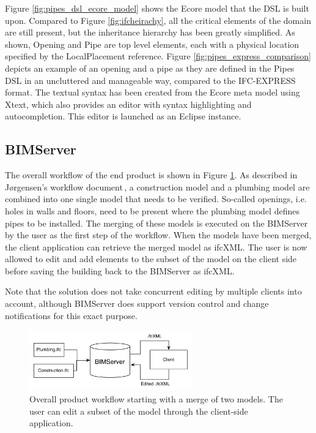 Figure \ref{fig:pipes_dsl_ecore_model} shows the Ecore model that the DSL is built upon. Compared to Figure \ref{fig:ifcheirachy}, all the critical elements of the domain are still present, but the inheritance hierarchy has been greatly simplified. As shown, Opening and Pipe are top level elements, each with a physical location specified by the LocalPlacement reference. Figure \ref{fig:pipes_express_comparison} depicts an example of an opening and a pipe as they are defined in the Pipes DSL in an uncluttered and manageable way, compared to the IFC-EXPRESS format. The textual syntax has been created from the Ecore meta model using Xtext, which also provides an editor with syntax highlighting and autocompletion. This editor is launched as an Eclipse instance.

\subsection{BIMServer}
The overall workflow of the end product is shown in Figure \ref{fig:overall_product_workflow}. As described in J\o rgensen's workflow document\,\cite{jorgensen12}, a construction model and a plumbing model are combined into one single model that needs to be verified. So-called openings, i.e. holes in walls and floors, need to be present where the plumbing model defines pipes to be installed. The merging of these models is executed on the BIMServer by the user as the first step of the workflow. When the models have been merged, the client application can retrieve the merged model as ifcXML. The user is now allowed to edit and add elements to the subset of the model on the client side before saving the building back to the BIMServer as ifcXML.

Note that the solution does not take concurrent editing by multiple clients into account, although BIMServer does support version control and change notifications for this exact purpose.

\begin{figure}[h]
    \centering
        \includegraphics[width=70mm]{images/CompleteWorkflow.pdf}
    \caption{Overall product workflow starting with a merge of two models. The user can edit a subset of the model through the client-side application.}
    \label{fig:overall_product_workflow}
\end{figure}

